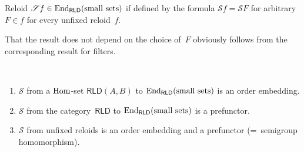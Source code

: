\begin{defn}
Reloid
$\mathscr{S}f\in\operatorname{End}_{\mathsf{RLD}}(\text{small sets})$
if defined by the formula
$\mathscr{S}f=\mathscr{S}F$ for arbitrary~$F\in f$
for every unfixed reloid~$f$.
\end{defn}

That the result does not depend on the choice of~$F$
obviously follows from the corresponding result for
filters.

\begin{prop}\label{s-rld}
~
\begin{enumerate}
\item\label{s-rld-hom} $\mathscr{S}$ from a $\operatorname{Hom}$-set $\mathsf{RLD}(A,B)$ to $\operatorname{End}_{\mathsf{RLD}}(\text{small sets})$
is an order embedding.
\item\label{s-rld-fctr} $\mathscr{S}$ from the category~$\mathsf{RLD}$ to $\operatorname{End}_{\mathsf{RLD}}(\text{small sets})$
is a prefunctor.
\item\label{s-rld-unfix} $\mathscr{S}$ from unfixed reloids is an order embedding and a prefunctor (=~semigroup homomorphism).
\end{enumerate}
\end{prop}

